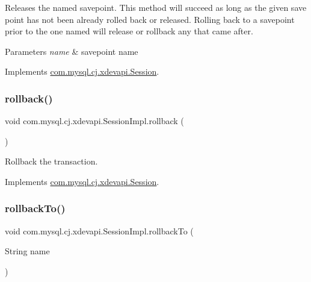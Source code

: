 Releases the named savepoint. This method will succeed as long as the given save point has not been already rolled back or released. Rolling back to a savepoint prior to the one named will release or rollback any that came after.


\begin{DoxyParams}{Parameters}
{\em name} & savepoint name \\
\hline
\end{DoxyParams}


Implements \mbox{\hyperlink{interfacecom_1_1mysql_1_1cj_1_1xdevapi_1_1_session_ad372434e6431ce9a396a29d03f3ad8c4}{com.\+mysql.\+cj.\+xdevapi.\+Session}}.

\mbox{\label{classcom_1_1mysql_1_1cj_1_1xdevapi_1_1_session_impl_a7c11c5d1f54f7a1f6ad2c0891dd59a67}} 
\subsubsection{\texorpdfstring{rollback()}{rollback()}}
{\footnotesize\ttfamily void com.\+mysql.\+cj.\+xdevapi.\+Session\+Impl.\+rollback (\begin{DoxyParamCaption}{ }\end{DoxyParamCaption})}

Rollback the transaction. 

Implements \mbox{\hyperlink{interfacecom_1_1mysql_1_1cj_1_1xdevapi_1_1_session_a7c850a35b858307dd253bac93a187e8b}{com.\+mysql.\+cj.\+xdevapi.\+Session}}.

\mbox{\label{classcom_1_1mysql_1_1cj_1_1xdevapi_1_1_session_impl_adcd0910556c2529fe20a6fa85c96a88d}} 
\subsubsection{\texorpdfstring{rollback\+To()}{rollbackTo()}}
{\footnotesize\ttfamily void com.\+mysql.\+cj.\+xdevapi.\+Session\+Impl.\+rollback\+To (\begin{DoxyParamCaption}\item[{String}]{name }\end{DoxyParamCaption})}

